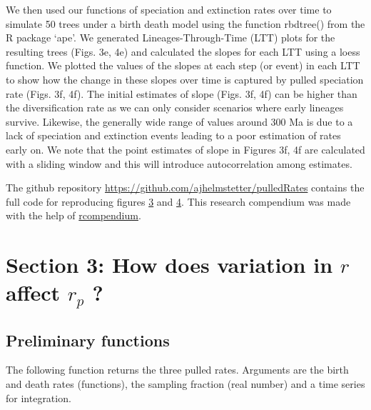 \documentclass[
]{article}
\begin{document}
We then used our functions of speciation and extinction rates over time
to simulate 50 trees under a birth death model using the function
rbdtree() from the R package `ape'. We generated Lineages-Through-Time
(LTT) plots for the resulting trees (Figs. 3e, 4e) and calculated the
slopes for each LTT using a loess function. We plotted the values of the
slopes at each step (or event) in each LTT to show how the change in
these slopes over time is captured by pulled speciation rate (Figs. 3f,
4f). The initial estimates of slope (Figs. 3f, 4f) can be higher than
the diversification rate as we can only consider scenarios where early
lineages survive. Likewise, the generally wide range of values around
300 Ma is due to a lack of speciation and extinction events leading to a
poor estimation of rates early on. We note that the point estimates of
slope in Figures 3f, 4f are calculated with a sliding window and this
will introduce autocorrelation among estimates.

The github repository \url{https://github.com/ajhelmstetter/pulledRates}
contains the full code for reproducing figures
\href{https://github.com/ajhelmstetter/pulledRates/blob/master/rscripts/fig3.R}{3}
and
\href{https://github.com/ajhelmstetter/pulledRates/blob/master/rscripts/fig4.R}{4}.
This research compendium was made with the help of
\href{https://github.com/FRBCesab/rcompendium}{rcompendium}.

\pagebreak

\hypertarget{section-3-how-does-variation-in-r-affect-r_p}{%
\section{\texorpdfstring{Section 3: How does variation in \(r\) affect
\(r_p\)
?}{Section 3: How does variation in r affect r\_p ?}}\label{section-3-how-does-variation-in-r-affect-r_p}}

\hypertarget{preliminary-functions}{%
\subsection{Preliminary functions}\label{preliminary-functions}}

The following function returns the three pulled rates. Arguments are the
birth and death rates (functions), the sampling fraction (real number)
and a time series for integration.
\end{document}
